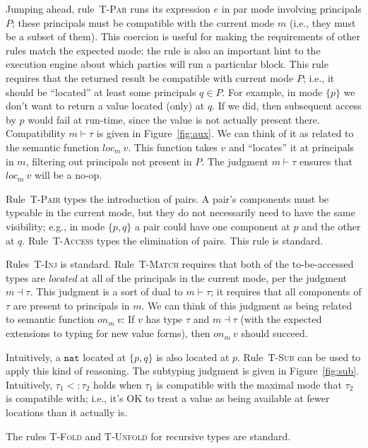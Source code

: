 \documentclass[10pt]{article}
\newcommand{\rulelab}[1]{{\small \textsc{#1}}}
\newcommand{\tnat}{\ensuremath{\mathtt{nat}}}
\newcommand{\subtype}{\ensuremath{<:}}
\newcommand{\issub}[2]{{#1} \subtype {#2}}
\newcommand{\locof}[2]{\ensuremath{\mathit{loc}_{#1}~{#2}}}
\newcommand{\getat}[2]{\ensuremath{\mathit{on}_{#1}~{#2}}}
\begin{document}
Jumping ahead, rule~\rulelab{T-Par} runs its expression $e$ in par
mode involving principals $P$; these principals must be compatible
with the current mode $m$ (i.e., they must be a subset of them). This
coercion is useful for making the requirements of other rules match
the expected mode; the rule is also an important hint to the execution
engine about which parties will run a particular block. This rule
requires that the returned result be compatible with current mode $P$;
i.e., it should be ``located'' at least some principals $q \in P$.  For
example, in mode $\{p\}$ we don't want to return a value located
(only) at $q$. If we did, then subsequent access by $p$ would fail at
run-time, since the value is not actually present there.
%
Compatibility $m \vdash \tau$ is given in Figure~\ref{fig:aux}. We can
think of it as related to the semantic function $\locof{m}{v}$. This
function takes $v$ and ``locates'' it at principals in $m$, filtering
out principals not present in $P$. The judgment $m \vdash \tau$
ensures that $\locof{m}{v}$ will be a no-op.

Rule~\rulelab{T-Pair} types the introduction of pairs. A pair's
components must be typeable in the current mode, but they do not
necessarily need to have the same visibility; e.g., in mode $\{p,q\}$
a pair could have one component at $p$ and the other at
$q$. Rule~\rulelab{T-Access} types the elimination of pairs. This rule
is standard.

Rules~\rulelab{T-Inj} is standard. Rule~\rulelab{T-Match} requires
that both of the to-be-accessed types are \emph{located} at all of the
principals in the current mode, per the judgment $m \dashv \tau$. This
judgment is a sort of dual to $m \vdash \tau$; it requires that all
components of $\tau$ are present to principals in $m$. We can think of
this judgment as being related to semantic function $\getat{m}{v}$: If $v$
has type $\tau$ and $m \dashv \tau$ (with the expected extensions to
typing for new value forms), then $\getat{m}{v}$ should succeed.

Intuitively, a $\tnat$ located at $\{p,q\}$ is also located at
$p$. Rule~\rulelab{T-Sub} can be used to apply this kind of
reasoning. The subtyping judgment is given in
Figure~\ref{fig:sub}. Intuitively, $\issub{\tau_1}{\tau_2}$ holds when
$\tau_1$ is compatible with the maximal mode that $\tau_2$ is
compatible with; i.e., it's OK to treat a value as being available at
fewer locations than it actually is.

The rules \rulelab{T-Fold} and \rulelab{T-Unfold} for recursive types
are standard.
\end{document}
